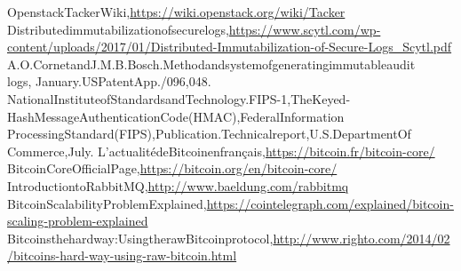 \begin{thebibliography}{99}
Openstack\enspace  Tacker\enspace Wiki,\url{https://wiki.openstack.org/wiki/Tacker}
Distributed\enspace immutabilization\enspace of\enspace secure\enspace logs,\enspace \url{https://www.scytl.com/wp-content/uploads/2017/01/Distributed-Immutabilization-of-Secure-Logs_Scytl.pdf}
A.O.\enspace Cornet\enspace and\enspace J.M.B.\enspace Bosch.\enspace Method\enspace and\enspace system\enspace of\enspace generating\enspace immutable\enspace audit\\ logs,\enspace
January.\enspace US\enspace Patent\enspace App./096,048. 
National\enspace Institute\enspace of\enspace Standards\enspace and\enspace Technology.\enspace FIPS-1,\enspace The\enspace Keyed-Hash\enspace Message\enspace Authentication\enspace Code\enspace (HMAC),\enspace Federal\enspace Information\\ Processing\enspace Standard\enspace (FIPS),\enspace Publication.\enspace Technical\enspace report,\enspace U.S.\enspace Department\enspace Of\\ Commerce,\enspace July.
L'actualité\enspace de\enspace Bitcoin\enspace en\enspace français,\enspace \url{https://bitcoin.fr/bitcoin-core/}
Bitcoin\enspace Core\enspace Official\enspace Page,\enspace \url{https://bitcoin.org/en/bitcoin-core/}
Introduction\enspace to\enspace RabbitMQ,\enspace \url{http://www.baeldung.com/rabbitmq}
Bitcoin\enspace Scalability\enspace Problem\enspace Explained,\enspace \url{https://cointelegraph.com/explained/bitcoin-scaling-problem-explained}
Bitcoins\enspace the\enspace hard\enspace way:\enspace Using\enspace the\enspace raw\enspace Bitcoin\enspace protocol,\enspace \url{http://www.righto.com/2014/02/bitcoins-hard-way-using-raw-bitcoin.html}



\end{thebibliography}
